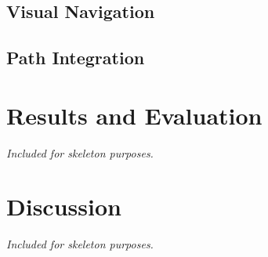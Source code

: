 \documentclass[a4paper,11pt,twoside,openright]{article}
\let\oldsection\section
\def\section{\cleardoublepage\oldsection}
\begin{document}
\subsection{Visual Navigation}
\subsection{Path Integration}
\newpage

\section{ Results and Evaluation } \label{sec:results}
\textit{Included for skeleton purposes.}
\newpage

\section{ Discussion }
\textit{Included for skeleton purposes.}
\newpage



\end{document}
